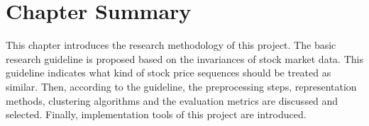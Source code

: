 \section{Chapter Summary}
This chapter introduces the research methodology of this project. The basic research guideline is proposed based on the invariances of stock market data. This guideline indicates what kind of stock price sequences should be treated as similar. Then, according to the guideline, the preprocessing steps, representation methods, clustering algorithms and the evaluation metrics are discussed and selected. Finally, implementation tools of this project are introduced.